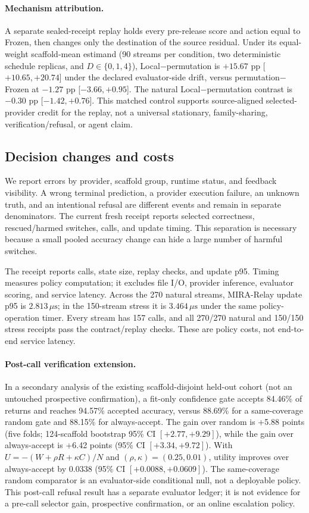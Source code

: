 \documentclass[sigconf,anonymous]{aamas}
\begin{document}
\paragraph{Mechanism attribution.} A separate sealed-receipt replay holds every pre-release score and action equal to Frozen, then changes only the destination of the source residual. Under its equal-weight scaffold-mean estimand (90 streams per condition, two deterministic schedule replicas, and $D\in\{0,1,4\}$), Local$-$permutation is $+15.67$ pp [$+10.65,+20.74$] under the declared evaluator-side drift, versus permutation$-$Frozen at $-1.27$ pp [$-3.66,+0.95$]. The natural Local$-$permutation contrast is $-0.30$ pp [$-1.42,+0.76$]. This matched control supports source-aligned selected-provider credit for the replay, not a universal stationary, family-sharing, verification/refusal, or agent claim.

\subsection{Decision changes and costs}
We report errors by provider, scaffold group, runtime status, and feedback visibility. A wrong terminal prediction, a provider execution failure, an unknown truth, and an intentional refusal are different events and remain in separate denominators. The current fresh receipt reports selected correctness, rescued/harmed switches, calls, and update timing. This separation is necessary because a small pooled accuracy change can hide a large number of harmful switches.

The receipt reports calls, state size, replay checks, and update p95. Timing measures policy computation; it excludes file I/O, provider inference, evaluator scoring, and service latency. Across the 270 natural streams, MIRA-Relay update p95 is $2.813\,\mu\mathrm{s}$; in the 150-stream stress it is $3.464\,\mu\mathrm{s}$ under the same policy-operation timer. Every stream has 157 calls, and all 270/270 natural and 150/150 stress receipts pass the contract/replay checks. These are policy costs, not end-to-end service latency.

\paragraph{Post-call verification extension.} In a secondary analysis of the existing scaffold-disjoint held-out cohort (not an untouched prospective confirmation), a fit-only confidence gate accepts 84.46\% of returns and reaches 94.57\% accepted accuracy, versus 88.69\% for a same-coverage random gate and 88.15\% for always-accept. The gain over random is +5.88 points (five folds; 124-scaffold bootstrap 95\% CI $[+2.77,+9.29]$), while the gain over always-accept is +6.42 points (95\% CI $[+3.34,+9.72]$). With $U=-(W+\rho R+\kappa C)/N$ and $(\rho,\kappa)=(0.25,0.01)$, utility improves over always-accept by 0.0338 (95\% CI $[+0.0088,+0.0609]$). The same-coverage random comparator is an evaluator-side conditional null, not a deployable policy. This post-call refusal result has a separate evaluator ledger; it is not evidence for a pre-call selector gain, prospective confirmation, or an online escalation policy.
\end{document}
